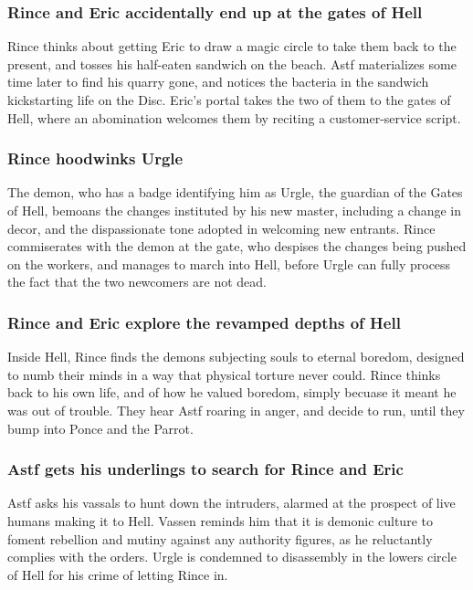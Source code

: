 \subsubsection{\Gls{Rince} and \Gls{Eric} accidentally end up at the gates of Hell}
\Gls{Rince} thinks about getting \Gls{Eric} to draw a magic circle to take them back to the present,
and tosses his half-eaten sandwich on the beach. \Gls{Astf} materializes some time later to find
his quarry gone, and notices the bacteria in the sandwich kickstarting life on the Disc.
\Gls{Eric}'s portal takes the two of them to the gates of Hell, where an abomination welcomes them
by reciting a customer-service script.

\subsubsection{\Gls{Rince} hoodwinks \Gls{Urgle}}
The demon, who has a badge identifying him as \Gls{Urgle}, the guardian of the Gates of Hell,
bemoans the changes instituted by his new master, including a change in decor, and the dispassionate
tone adopted in welcoming new entrants. \Gls{Rince} commiserates with the demon at the gate,
who despises the changes being pushed on the workers, and manages to march into Hell, before
\Gls{Urgle} can fully process the fact that the two newcomers are not dead.

\subsubsection{\Gls{Rince} and \Gls{Eric} explore the revamped depths of Hell}
Inside Hell, \Gls{Rince} finds the demons subjecting souls to eternal boredom, designed to numb
their minds in a way that physical torture never could. \Gls{Rince} thinks back to his own life,
and of how he valued boredom, simply becuase it meant he was out of trouble. They hear \Gls{Astf}
roaring in anger, and decide to run, until they bump into \Gls{Ponce} and the \Gls{Parrot}.

\subsubsection{\Gls{Astf} gets his underlings to search for \Gls{Rince} and \Gls{Eric}}
\Gls{Astf} asks his vassals to hunt down the intruders, alarmed at the prospect of live humans
making it to Hell. \Gls{Vassen} reminds him that it is demonic culture to foment rebellion and
mutiny against any authority figures, as he reluctantly complies with the orders. \Gls{Urgle} is
condemned to disassembly in the lowers circle of Hell for his crime of letting \Gls{Rince} in.

